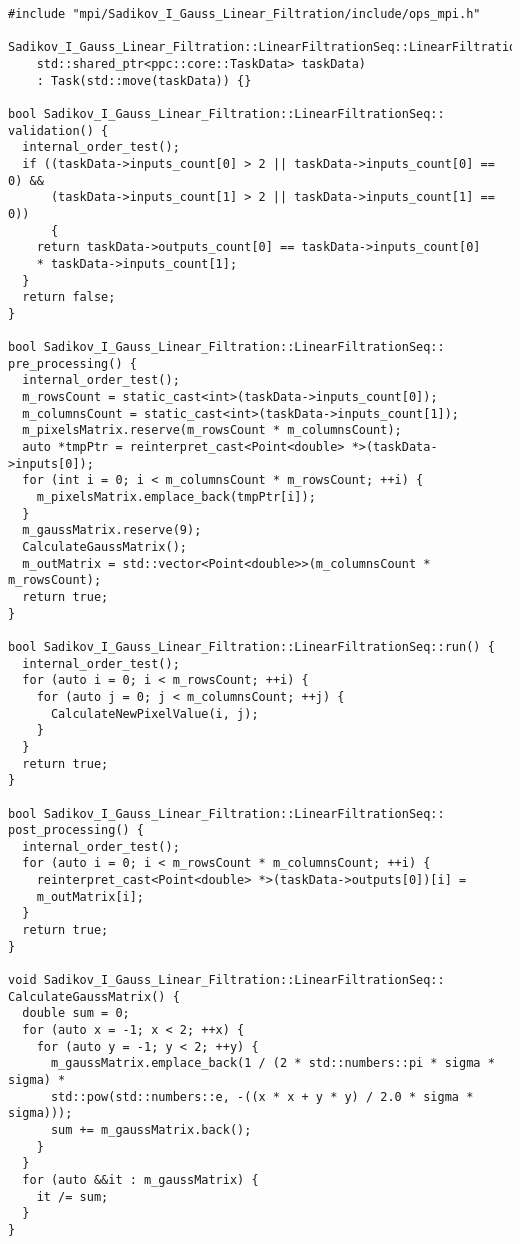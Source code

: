 \documentclass[14pt]{article}
\begin{document}
\newpage
\begin{verbatim}
#include "mpi/Sadikov_I_Gauss_Linear_Filtration/include/ops_mpi.h"

Sadikov_I_Gauss_Linear_Filtration::LinearFiltrationSeq::LinearFiltrationSeq(
    std::shared_ptr<ppc::core::TaskData> taskData)
    : Task(std::move(taskData)) {}

bool Sadikov_I_Gauss_Linear_Filtration::LinearFiltrationSeq::
validation() {
  internal_order_test();
  if ((taskData->inputs_count[0] > 2 || taskData->inputs_count[0] == 0) &&
      (taskData->inputs_count[1] > 2 || taskData->inputs_count[1] == 0)) 
      {
    return taskData->outputs_count[0] == taskData->inputs_count[0]
    * taskData->inputs_count[1];
  }
  return false;
}

bool Sadikov_I_Gauss_Linear_Filtration::LinearFiltrationSeq::
pre_processing() {
  internal_order_test();
  m_rowsCount = static_cast<int>(taskData->inputs_count[0]);
  m_columnsCount = static_cast<int>(taskData->inputs_count[1]);
  m_pixelsMatrix.reserve(m_rowsCount * m_columnsCount);
  auto *tmpPtr = reinterpret_cast<Point<double> *>(taskData->inputs[0]);
  for (int i = 0; i < m_columnsCount * m_rowsCount; ++i) {
    m_pixelsMatrix.emplace_back(tmpPtr[i]);
  }
  m_gaussMatrix.reserve(9);
  CalculateGaussMatrix();
  m_outMatrix = std::vector<Point<double>>(m_columnsCount * m_rowsCount);
  return true;
}

bool Sadikov_I_Gauss_Linear_Filtration::LinearFiltrationSeq::run() {
  internal_order_test();
  for (auto i = 0; i < m_rowsCount; ++i) {
    for (auto j = 0; j < m_columnsCount; ++j) {
      CalculateNewPixelValue(i, j);
    }
  }
  return true;
}

bool Sadikov_I_Gauss_Linear_Filtration::LinearFiltrationSeq::
post_processing() {
  internal_order_test();
  for (auto i = 0; i < m_rowsCount * m_columnsCount; ++i) {
    reinterpret_cast<Point<double> *>(taskData->outputs[0])[i] =
    m_outMatrix[i];
  }
  return true;
}

void Sadikov_I_Gauss_Linear_Filtration::LinearFiltrationSeq::
CalculateGaussMatrix() {
  double sum = 0;
  for (auto x = -1; x < 2; ++x) {
    for (auto y = -1; y < 2; ++y) {
      m_gaussMatrix.emplace_back(1 / (2 * std::numbers::pi * sigma * sigma) *
      std::pow(std::numbers::e, -((x * x + y * y) / 2.0 * sigma * sigma)));
      sum += m_gaussMatrix.back();
    }
  }
  for (auto &&it : m_gaussMatrix) {
    it /= sum;
  }
}


\end{verbatim}
\end{document}

